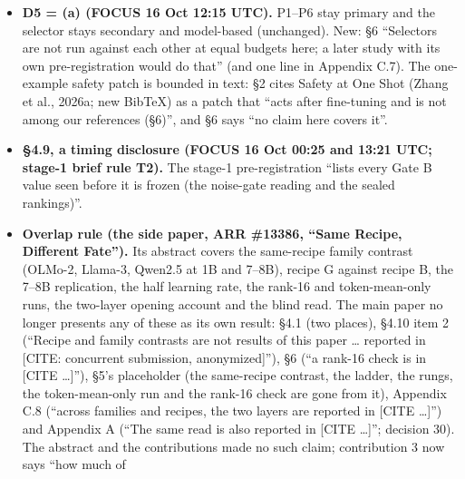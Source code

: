 \documentclass{article}
\theoremstyle{plain}
\theoremstyle{definition}
\theoremstyle{remark}
\begin{document}
\begin{itemize}
        (NONE\_FINDS, AGREE, ATTR\_BETTER, REP\_BETTER, TOO CLOSE), AGREE's
        definition (pick\_A = pick\_R; kill-test design \S{}4.4) and the
        pick-arm G1 guard: with equal picks $\Delta$ = 0, so ATTR\_BETTER
        ($\Delta$ $\ge$ $M_{C}$) and REP\_BETTER ($\Delta$ $\le$ $-$$M_{C}$)
        cannot hold, and TOO CLOSE can come only from the guard. Appendix C.2
        also notes that wave 2 then holds m = 2 or 3 units. The body names no
        category; the development evidence does.
  \item \textbf{D5 = (a) (FOCUS 16 Oct 12:15 UTC).} P1--P6 stay primary and the
        selector stays secondary and model-based (unchanged). New: \S{}6
        ``Selectors are not run against each other at equal budgets here; a
        later study with its own pre-registration would do that'' (and one line
        in Appendix C.7). The one-example safety patch is bounded in text: \S{}2
        cites Safety at One Shot (Zhang et al., 2026a; new BibTeX) as a patch
        that ``acts after fine-tuning and is not among our references (\S{}6)'',
        and \S{}6 says ``no claim here covers it''.
  \item \textbf{\S{}4.9, a timing disclosure (FOCUS 16 Oct 00:25 and 13:21 UTC;
        stage-1 brief rule T2).} The stage-1 pre-registration ``lists every Gate
        B value seen before it is frozen (the noise-gate reading and the sealed
        rankings)''.
  \item \textbf{Overlap rule (the side paper, ARR \#13386, ``Same Recipe,
        Different Fate'').} Its abstract covers the same-recipe family contrast
        (OLMo-2, Llama-3, Qwen2.5 at 1B and 7--8B), recipe G against recipe B,
        the 7--8B replication, the half learning rate, the rank-16 and
        token-mean-only runs, the two-layer opening account and the blind read.
        The main paper no longer presents any of these as its own result:
        \S{}4.1 (two places), \S{}4.10 item 2 (``Recipe and family contrasts are
        not results of this paper \ldots{} reported in [CITE: concurrent
        submission, anonymized]''), \S{}6 (``a rank-16 check is in [CITE
        \ldots{}]''), \S{}5's placeholder (the same-recipe contrast, the ladder,
        the rungs, the token-mean-only run and the rank-16 check are gone from
        it), Appendix C.8 (``across families and recipes, the two layers are
        reported in [CITE \ldots{}]'') and Appendix A (``The same read is also
        reported in [CITE \ldots{}]''; decision 30). The abstract and the
        contributions made no such claim; contribution 3 now says ``how much of
$$
\end{itemize}
\end{document}
